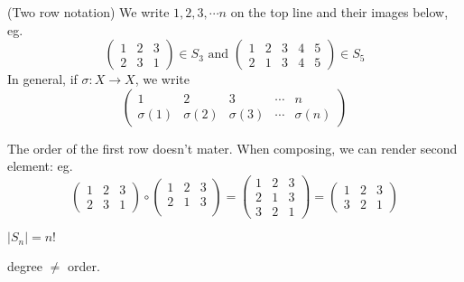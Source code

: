 \documentclass[a4paper]{article}
\begin{document}
  \begin{notation}
    (Two row notation) We write $1, 2, 3, \cdots n$ on the top line and their images below, eg.
    \[
      \begin{pmatrix}
        1 & 2 & 3\\
        2 & 3 & 1
      \end{pmatrix}\in S_3 \text{ and }
      \begin{pmatrix}
        1 & 2 & 3 & 4 & 5\\
        2 & 1 & 3 & 4 & 5
      \end{pmatrix}\in S_5
    \]
    In general, if $\sigma: X\to X$, we write
    \[
      \begin{pmatrix}
        1 & 2 & 3 &\cdots& n\\
        \sigma(1) & \sigma(2)&\sigma(3) &\cdots& \sigma{(n)}
      \end{pmatrix}
    \]
    \begin{note}
      The order of the first row doesn't mater. When composing, we can render second element: eg. 
      \[
        \begin{pmatrix}
          1 & 2 & 3\\
          2 & 3 & 1
        \end{pmatrix}
        \circ
        \begin{pmatrix}
          1 & 2 & 3\\
          2 & 1 & 3\\
        \end{pmatrix}
        =
        \begin{pmatrix}
          1 & 2 & 3\\
          2 & 1 & 3\\
          3 & 2 & 1
        \end{pmatrix}
        = 
        \begin{pmatrix}
          1 & 2 & 3\\
          3 & 2 & 1
        \end{pmatrix}
      \]
    \end{note}
  \end{notation}
  \begin{prop}
    $|S_n| = n!$
  \end{prop}
  \note degree $\not=$ order.
\end{document}
